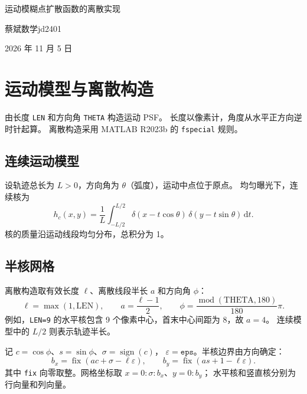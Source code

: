 \documentclass[UTF8,12pt,a4paper]{ctexart}
\begin{document}
\begin{center}
{\fontsize{22}{30}\selectfont\heiti\color{Ink}运动模糊点扩散函数的离散实现}\par\vspace{8pt}
{\small 蔡斌\qquad 数学jd2401}\par\vspace{4pt}
{\small\color{Muted}2026 年 11 月 5 日}
\end{center}

\section{运动模型与离散构造}
由长度 \texttt{LEN} 和方向角 \texttt{THETA} 构造运动 PSF。
长度以像素计，角度从水平正方向逆时针起算\cite{doc}。
离散构造采用 MATLAB R2023b 的 \texttt{fspecial} 规则\cite{local}。

\subsection{连续运动模型}
设轨迹总长为 $L>0$，方向角为 $\theta$（弧度），运动中点位于原点。
均匀曝光下，连续核为
\begin{equation}
 h_c(x,y)=\frac{1}{L}\int_{-L/2}^{L/2}
 \delta(x-t\cos\theta)\,\delta(y-t\sin\theta)\,\mathrm dt.
\end{equation}
核的质量沿运动线段均匀分布，总积分为 1。

\subsection{半核网格}
离散构造取有效长度 $\ell$、离散线段半长 $a$ 和方向角 $\phi$：
\begin{equation}
 \ell=\max(1,\mathrm{LEN}),\qquad a=\frac{\ell-1}{2},\qquad
 \phi=\frac{\operatorname{mod}(\mathrm{THETA},180)}{180}\pi.
\end{equation}
例如，\texttt{LEN=9} 的水平核包含 9 个像素中心，首末中心间距为 8，故 $a=4$。
连续模型中的 $L/2$ 则表示轨迹半长。

记 $c=\cos\phi$、$s=\sin\phi$、$\sigma=\operatorname{sign}(c)$，
$\varepsilon=\texttt{eps}$。半核边界由方向确定：
\begin{equation}
 b_x=\operatorname{fix}(ac+\sigma-\ell\varepsilon),\qquad
 b_y=\operatorname{fix}(as+1-\ell\varepsilon).
\end{equation}
其中 \texttt{fix} 向零取整。网格坐标取 $x=0:\sigma:b_x$、$y=0:b_y$；
水平核和竖直核分别为行向量和列向量。
\end{document}
